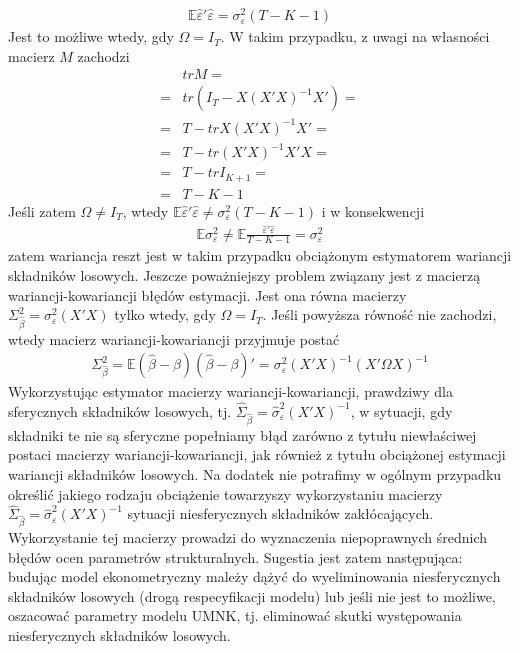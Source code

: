 \begin{gather*}
\mathbb E \hat{\varepsilon}'\hat{\varepsilon}=\sigma^2_\varepsilon\left(T-K-1\right)
\end{gather*}
Jest to możliwe wtedy, gdy $ \Omega=I_T $. W takim przypadku, z uwagi na własności macierz $ M $ zachodzi
\begin{align*}
&trM
=\\=&
tr\left(I_T-X(X'X)^{-1}X'\right)
=\\=&
T-trX(X'X)^{-1}X'
=\\=&
T-tr(X'X)^{-1}X'X
=\\=&
T-trI_{K+1}
=\\=&
T-K-1
\end{align*}
Jeśli zatem $ \Omega\neq I_T $, wtedy $ \mathbb E \hat{\varepsilon}'\hat{\varepsilon}\neq\sigma^2_\varepsilon\left(T-K-1\right) $ i w konsekwencji
\begin{gather*}
\mathbb E \sigma^2_\varepsilon\neq
\mathbb E \tfrac{\hat{\varepsilon}'\hat{\varepsilon}}{T-K-1}=\sigma^2_\varepsilon
\end{gather*}
zatem wariancja reszt jest w takim przypadku obciążonym estymatorem wariancji składników losowych. Jeszcze poważniejszy problem związany jest z macierzą wariancji-kowariancji błędów estymacji. Jest ona równa macierzy $ \Sigma^2_{\hat{\beta}}=\sigma^2_\varepsilon\left(X'X\right) $ tylko wtedy, gdy $ \Omega=I_T $. Jeśli powyższa równość nie zachodzi, wtedy macierz wariancji-kowariancji przyjmuje postać
\begin{gather*}
\Sigma^2_{\hat{\beta}}=
\mathbb E \left(\hat{\beta}-\beta\right)\left(\hat{\beta}-\beta\right)'=
\sigma_\varepsilon^2\left(X'X\right)^{-1}\left(X'\Omega X\right)^{-1}
\end{gather*}
Wykorzystując estymator macierzy wariancji-kowariancji, prawdziwy dla sferycznych składników losowych, tj. $ \hat\Sigma_{\hat{\beta}}=\hat{\sigma}_\varepsilon^2(X'X)^{-1} $, w sytuacji, gdy składniki te nie są sferyczne popełniamy błąd zarówno z tytułu niewłaściwej postaci macierzy wariancji-kowariancji, jak również z tytułu obciążonej estymacji wariancji składników losowych. Na dodatek nie potrafimy w ogólnym przypadku określić jakiego rodzaju obciążenie towarzyszy wykorzystaniu macierzy $ \hat\Sigma_{\hat{\beta}}=\hat{\sigma}_\varepsilon^2(X'X)^{-1} $ sytuacji niesferycznych składników zakłócających. Wykorzystanie tej macierzy prowadzi do wyznaczenia niepoprawnych średnich błędów ocen parametrów strukturalnych.
Sugestia jest zatem następująca:\\
budując model ekonometryczny mależy dążyć do wyeliminowania niesferycznych składników losowych (drogą respecyfikacji modelu) lub jeśli nie jest to możliwe, oszacować parametry modelu UMNK, tj. eliminować skutki występowania niesferycznych składników losowych.
